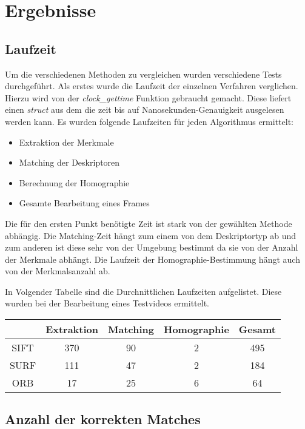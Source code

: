 \chapter{Ergebnisse}

\section{Laufzeit}


Um die verschiedenen Methoden zu vergleichen wurden verschiedene Tests durchgeführt.
Als erstes wurde die Laufzeit der einzelnen Verfahren verglichen. 
Hierzu wird von der \emph{clock\_gettime} Funktion gebraucht gemacht. Diese liefert einen \emph{struct} aus dem die zeit bis auf Nanosekunden-Genauigkeit ausgelesen werden kann.
Es wurden folgende Laufzeiten für jeden Algorithmus ermittelt:
\begin{itemize}
\item Extraktion der Merkmale
\item Matching der Deskriptoren
\item Berechnung der Homographie
\item Gesamte Bearbeitung eines Frames
\end{itemize}

Die für den ersten Punkt benötigte Zeit ist stark von der gewählten Methode abhängig. 
Die Matching-Zeit hängt zum einem von dem Deskriptortyp ab und zum anderen ist diese sehr von der Umgebung bestimmt da sie von der Anzahl der Merkmale abhängt.
Die Laufzeit der Homographie-Bestimmung hängt auch von der Merkmalsanzahl ab.

In Volgender Tabelle sind die Durchnittlichen Laufzeiten aufgelistet. Diese wurden bei der Bearbeitung eines Testvideos ermittelt.

\begin{center}
    \begin{tabular}{ c | C | C | C | C |}
      & Extraktion & Matching & Homographie & Gesamt\\ \hline
    SIFT & 370 & 90 & 2 & 495 \\ \hline
    SURF & 111 & 47 & 2 & 184 \\ \hline
    ORB & 17 & 25 & 6 & 64 \\
    \hline
    \end{tabular}
\end{center}


\section{Anzahl der korrekten Matches}

